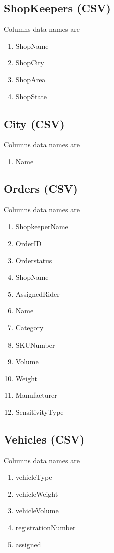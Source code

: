 \documentclass[12pt,a4paper]{article}
\begin{document}
\subsection{ShopKeepers (CSV)}
Columns data names are
\begin{enumerate} 
\item 	ShopName 
\item ShopCity 
\item ShopArea 
\item ShopState

\end{enumerate}

\subsection{City (CSV)}
Columns data names are
\begin{enumerate} 
\item Name
\end{enumerate}


\subsection{Orders (CSV)}

Columns data names are
\begin{enumerate}
\item ShopkeeperName
\item OrderID 		
\item Orderstatus 	
\item ShopName 	
\item AssignedRider 

\item Name		 
\item Category 		
\item SKUNumber 		
\item Volume 		 
\item Weight 			
\item Manufacturer 
\item SensitivityType	


\end{enumerate}

\subsection{Vehicles (CSV)}
Columns data names are
\begin{enumerate}
\item vehicleType			
\item vehicleWeight		
\item vehicleVolume 		
\item registrationNumber	
\item assigned 			

\end{enumerate}
\end{document}
